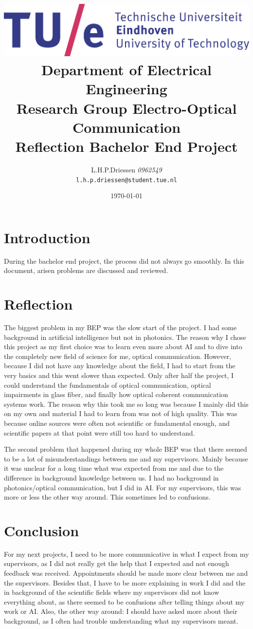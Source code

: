 \documentclass[a4paper]{article}
\title{\includegraphics[width=0.8\linewidth]{images/tue-logo-high}\\\large{Department of Electrical Engineering\\Research Group Electro-Optical Communication}\\\vspace{0.5cm}\LARGE{Reflection Bachelor End Project}}
\author{L.H.P.Driessen \textit{0962549}\\\texttt{l.h.p.driessen@student.tue.nl}}
\date{\today}
\begin{document}
\maketitle
\section{Introduction}
During the bachelor end project, the process did not always go smoothly. In this document, arisen problems are discussed and reviewed.

\section{Reflection}
The biggest problem in my BEP was the slow start of the project. I had some background in artificial intelligence but not in photonics. The reason why I chose this project as my first choice was to learn even more about AI and to dive into the completely new field of science for me, optical communication. However, because I did not have any knowledge about the field, I had to start from the very basics and this went slower than expected. Only after half the project, I could understand the fundamentals of optical communication, optical impairments in glass fiber, and finally how optical coherent communication systems work. The reason why this took me so long was because I mainly did this on my own and material I had to learn from was not of high quality. This was because online sources were often not scientific or fundamental enough, and scientific papers at that point were still too hard to understand.

The second problem that happened during my whole BEP was that there seemed to be a lot of misunderstandings between me and my supervisors. Mainly because it was unclear for a long time what was expected from me and due to the difference in background knowledge between us. I had no background in photonics/optical communication, but I did in AI. For my supervisors, this was more or less the other way around. This sometimes led to confusions.

\section{Conclusion}
For my next projects, I need to be more communicative in what I expect from my supervisors, as I did not really get the help that I expected and not enough feedback was received. Appointments should be made more clear between me and the supervisors. Besides that, I have to be more explaining in work I did and the in background of the scientific fields where my supervisors did not know everything about, as there seemed to be confusions after telling things about my work or AI. Also, the other way around: I should have asked more about their background, as I often had trouble understanding what my supervisors meant.
\end{document}
